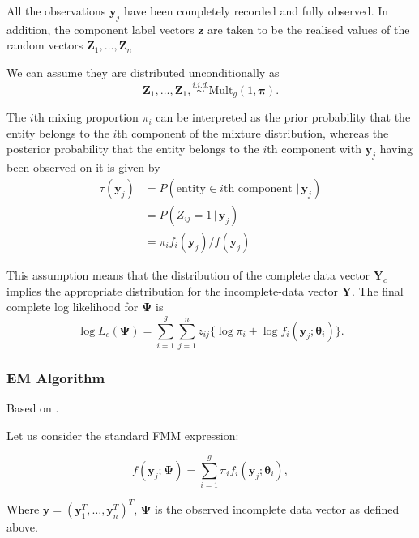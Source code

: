 \documentclass{article}\usepackage[]{graphicx}\usepackage[]{xcolor}
\theoremstyle{plain}
\theoremstyle{definition}
\theoremstyle{remark}
\newcommand{\boldY}{\mathbf{Y}}
\newcommand{\boldZ}{\mathbf{Z}}
\newcommand{\boldz}{\mathbf{z}}
\newcommand{\boldy}{\mathbf{y}}
\newcommand{\boldtheta}{\boldsymbol{\theta}}
\newcommand{\boldPsi}{\boldsymbol{\Psi}}
\begin{document}
All  the observations $\boldy_j$ have been completely recorded and fully observed. In addition, the component label vectors $\boldz$ are taken to be the realised values of the random vectors $\boldZ_1, \dots, \boldZ_n$

We can assume they are distributed unconditionally as
\begin{equation*}
    \boldZ_1, \dots, \boldZ_1, \stackrel{i.i.d.}{\sim} \text{Mult}_g (1, \boldsymbol{\pi}).
\end{equation*}

The $i$th mixing proportion $\pi_i$ can be interpreted as the prior probability that the entity belongs to the $i$th component of the mixture distribution, whereas the posterior probability that the entity belongs to the $i$th component with $\boldy_j$ having been observed on it is given by
\begin{align*}
    \tau(\boldy_j) &= P(\text{entity} \in i\text{th component } \vert \, \boldy_j ) \\
    &= P(Z_{ij} = 1 \, \vert \, \boldy_j) \\
    &= \pi_i f_i(\boldy_j) / f(\boldy_j)
\end{align*}

This assumption means that the distribution of the complete data vector $\boldY_c$ implies the appropriate distribution for the incomplete-data vector $\boldY$. The final complete log likelihood for $\boldPsi$ is
\begin{equation} \label{eq:llcomplete}
    \log L_c (\boldPsi) = \sum_{i=1}^g \sum_{j=1}^n z_{ij} \{ \log \pi_i + \log f_i (\boldy_j ; \boldtheta_i)\}.
\end{equation}


\subsubsection{EM Algorithm}
Based on \cite[Section 2.8]{FMMs_Book}.

Let us consider the standard FMM expression:

\begin{equation*}
    f(\boldy_j ; \boldPsi) = \sum_{i=1}^g \pi_i f_i (\boldy_j ; \boldtheta_i),
\end{equation*}

Where $\boldy = (\boldy_1^T, \dots, \boldy_n^T)^T$, $\boldPsi$ is the observed incomplete data vector as defined above.
\end{document}
